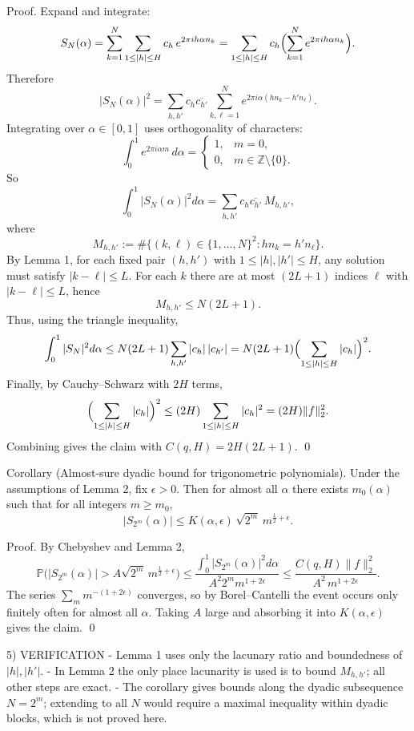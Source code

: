 Proof.
Expand and integrate:
\[
S_N(\alpha)=\sum_{k=1}^N \sum_{1\le |h|\le H} c_h\,e^{2\pi i h\alpha n_k}
=\sum_{1\le |h|\le H} c_h \Bigl(\sum_{k=1}^N e^{2\pi i h\alpha n_k}\Bigr).
\]
Therefore
\[
|S_N(\alpha)|^2 = \sum_{h,h'} c_h\overline{c_{h'}}\sum_{k,\ell=1}^N e^{2\pi i\alpha(h n_k-h' n_\ell)}.
\]
Integrating over $\alpha\in[0,1]$ uses orthogonality of characters:
\[
\int_0^1 e^{2\pi i\alpha m}\,d\alpha = \begin{cases}1,&m=0,\\0,&m\in\mathbb{Z}\setminus\{0\}.
\end{cases}
\]
So
\[
\int_0^1 |S_N(\alpha)|^2 d\alpha
= \sum_{h,h'} c_h\overline{c_{h'}}\,M_{h,h'},
\]
where
\[
M_{h,h'} := \#\{(k,\ell)\in\{1,\dots,N\}^2 : h n_k = h' n_\ell\}.
\]
By Lemma 1, for each fixed pair $(h,h')$ with $1\le |h|,|h'|\le H$, any solution must satisfy $|k-\ell|\le L$.  For each $k$ there are at most $(2L+1)$ indices $\ell$ with $|k-\ell|\le L$, hence
\[
M_{h,h'}\le N(2L+1).
\]
Thus, using the triangle inequality,
\[
\int_0^1 |S_N|^2 d\alpha
\le N(2L+1)\sum_{h,h'} |c_h|\,|c_{h'}|
= N(2L+1)\Bigl(\sum_{1\le |h|\le H}|c_h|\Bigr)^2.
\]
Finally, by Cauchy--Schwarz with $2H$ terms,
\[
\Bigl(\sum_{1\le |h|\le H}|c_h|\Bigr)^2 \le (2H)\sum_{1\le |h|\le H}|c_h|^2 = (2H)\|f\|_2^2.
\]
Combining gives the claim with $C(q,H)=2H(2L+1)$. \qed

Corollary (Almost-sure dyadic bound for trigonometric polynomials).
Under the assumptions of Lemma 2, fix $\epsilon>0$.  Then for almost all $\alpha$ there exists $m_0(\alpha)$ such that for all integers $m\ge m_0$,
\[
|S_{2^m}(\alpha)| \le K(\alpha,\epsilon)\,\sqrt{2^m}\,m^{\frac12+\epsilon}.
\]

Proof.
By Chebyshev and Lemma 2,
\[
\mathbb{P}\bigl(|S_{2^m}(\alpha)|>A\sqrt{2^m}\,m^{\frac12+\epsilon}\bigr)
\le \frac{\int_0^1 |S_{2^m}(\alpha)|^2 d\alpha}{A^2 2^m m^{1+2\epsilon}}
\le \frac{C(q,H)\|f\|_2^2}{A^2\,m^{1+2\epsilon}}.
\]
The series $\sum_m m^{-(1+2\epsilon)}$ converges, so by Borel--Cantelli the event occurs only finitely often for almost all $\alpha$.  Taking $A$ large and absorbing it into $K(\alpha,\epsilon)$ gives the claim. \qed

5) VERIFICATION
- Lemma 1 uses only the lacunary ratio and boundedness of $|h|,|h'|$.
- In Lemma 2 the only place lacunarity is used is to bound $M_{h,h'}$; all other steps are exact.
- The corollary gives bounds along the dyadic subsequence $N=2^m$; extending to all $N$ would require a maximal inequality within dyadic blocks, which is not proved here.

